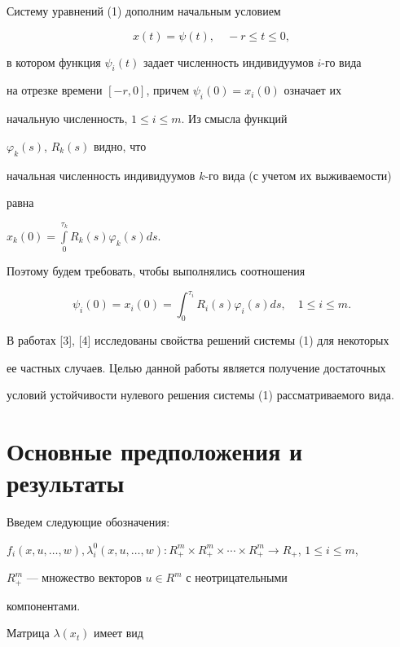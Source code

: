 Систему уравнений (1) дополним начальным условием


\begin{equation}


x(t)= \psi (t), \quad -r\le t \le 0,


\end{equation}


в котором функция $\psi_i (t)$ задает численность индивидуумов $i$-го вида


на отрезке времени $[-r,0]$, причем $\psi_i (0)=x_i (0)$ означает их


начальную численность, $1 \le i \le m$. Из смысла функций


$\varphi_k(s)$, $R_k(s)$ видно, что


начальная численность индивидуумов $k$-го вида (с учетом их выживаемости)


равна


$x_k(0)=\int\limits_0^{\tau_k}R_k(s) \varphi_k(s)ds$.


Поэтому будем требовать, чтобы выполнялись соотношения


$$


\psi_i(0)=x_i(0)=\int_0^{\tau_i}R_i(s)


\varphi_i(s)ds, \quad 1 \le i \le m.


$$


В работах [3], [4] исследованы свойства решений системы (1) для некоторых


ее частных случаев. Целью данной работы является получение достаточных


условий устойчивости нулевого решения системы (1) рассматриваемого вида.





\section{Основные предположения и результаты}





Введем следующие обозначения:


$f_i(x,u,\dotsc,w),\lambda_i^0(x,u,\dotsc,w):R^m_+


\times R^m_+ \times\dotsb\times R^m_+ \to R_+$, $1 \le i \le m$,


$R^m_+$ --- множество векторов $u\in R^m$ с неотрицательными


компонентами.


Матрица $\lambda(x_t)$ имеет вид


